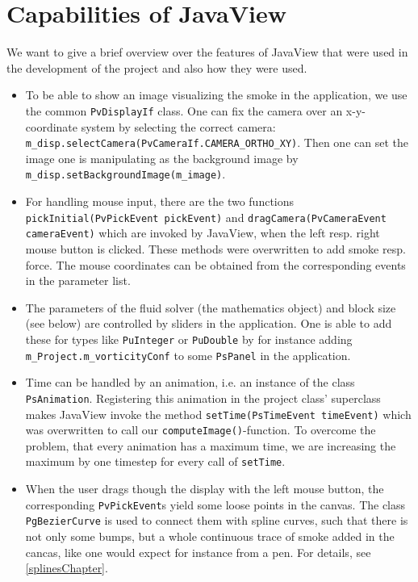 \documentclass[a4paper,10pt,oneside,final,german,openbib,pdftex,titlepage]{scrbook}
\begin{document}
\section{Capabilities of JavaView}
We want to give a brief overview over the features of JavaView that were used in the development of the project and also how they were used.
\begin{itemize}
\item To be able to show an image visualizing the smoke in the application, we use the common \texttt{PvDisplayIf} class. One can fix the camera over an x-y-coordinate system by selecting the correct camera: \texttt{m\_disp.selectCamera(PvCameraIf.CAMERA\_ORTHO\_XY)}. Then one can set the image one is manipulating as the background image by \texttt{m\_disp.setBackgroundImage(m\_image)}.
\item For handling mouse input, there are the two functions \texttt{pickInitial(PvPickEvent pickEvent)} and \texttt{dragCamera(PvCameraEvent cameraEvent)} which are invoked by JavaView, when the left resp. right mouse button is clicked. These methods were overwritten to add smoke resp. force. The mouse coordinates can be obtained from the corresponding events in the parameter list.
\item The parameters of the fluid solver (the \grqq mathematics object\grqq) and block size (see below) are controlled by sliders in the application. One is able to add these for types like \texttt{PuInteger} or \texttt{PuDouble} by for instance adding \texttt{m\_Project.m\_vorticityConf} to some \texttt{PsPanel} in the application.
\item Time can be handled by an animation, i.e. an instance of the class \texttt{PsAnimation}. Registering this animation in the project class' superclass makes JavaView invoke the method \texttt{setTime(PsTimeEvent timeEvent)} which was overwritten to call our \texttt{computeImage()}-function. To overcome the problem, that every animation has a maximum time, we are increasing the maximum by one timestep for every call of \texttt{setTime}.
\item When the user drags though the display with the left mouse button, the corresponding \texttt{PvPickEvent}s yield some loose points in the canvas. The class \texttt{PgBezierCurve} is used to connect them with spline curves, such that there is not only some bumps, but a whole continuous trace of smoke added in the cancas, like one would expect for instance from a pen. For details, see \ref{splinesChapter}.
\end{itemize}
%
\end{document}
